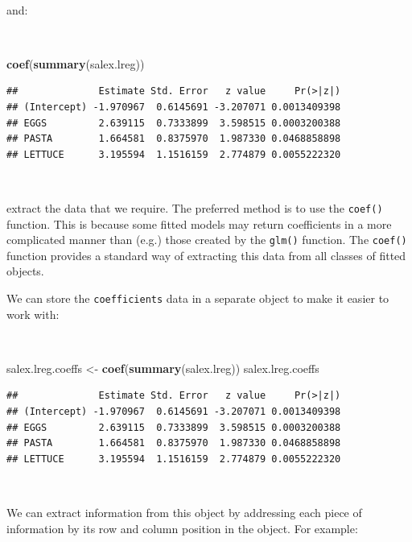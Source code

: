 \documentclass[12pt,a4paper]{book}
\newenvironment{Shaded}{\begin{snugshade}}{\end{snugshade}}
\newcommand{\KeywordTok}[1]{\textcolor[rgb]{0.13,0.29,0.53}{\textbf{#1}}}
\newcommand{\NormalTok}[1]{#1}
\newcommand{\StringTok}[1]{\textcolor[rgb]{0.31,0.60,0.02}{#1}}
\theoremstyle{definition}
\theoremstyle{definition}
\theoremstyle{definition}
\theoremstyle{remark}
\begin{document}
~

and:

~

\begin{Shaded}
\begin{Highlighting}[]
\KeywordTok{coef}\NormalTok{(}\KeywordTok{summary}\NormalTok{(salex.lreg))}
\end{Highlighting}
\end{Shaded}

\begin{verbatim}
##              Estimate Std. Error   z value     Pr(>|z|)
## (Intercept) -1.970967  0.6145691 -3.207071 0.0013409398
## EGGS         2.639115  0.7333899  3.598515 0.0003200388
## PASTA        1.664581  0.8375970  1.987330 0.0468858898
## LETTUCE      3.195594  1.1516159  2.774879 0.0055222320
\end{verbatim}

~

extract the data that we require. The preferred method is to use the
\texttt{coef()} function. This is because some fitted models may return
coefficients in a more complicated manner than (e.g.) those created by
the \texttt{glm()} function. The \texttt{coef()} function provides a
standard way of extracting this data from all classes of fitted objects.

\newpage

We can store the \texttt{coefficients} data in a separate object to make
it easier to work with:

~

\begin{Shaded}
\begin{Highlighting}[]
\NormalTok{salex.lreg.coeffs <-}\StringTok{ }\KeywordTok{coef}\NormalTok{(}\KeywordTok{summary}\NormalTok{(salex.lreg))}
\NormalTok{salex.lreg.coeffs}
\end{Highlighting}
\end{Shaded}

\begin{verbatim}
##              Estimate Std. Error   z value     Pr(>|z|)
## (Intercept) -1.970967  0.6145691 -3.207071 0.0013409398
## EGGS         2.639115  0.7333899  3.598515 0.0003200388
## PASTA        1.664581  0.8375970  1.987330 0.0468858898
## LETTUCE      3.195594  1.1516159  2.774879 0.0055222320
\end{verbatim}

~

We can extract information from this object by addressing each piece of
information by its row and column position in the object. For example:
\end{document}
